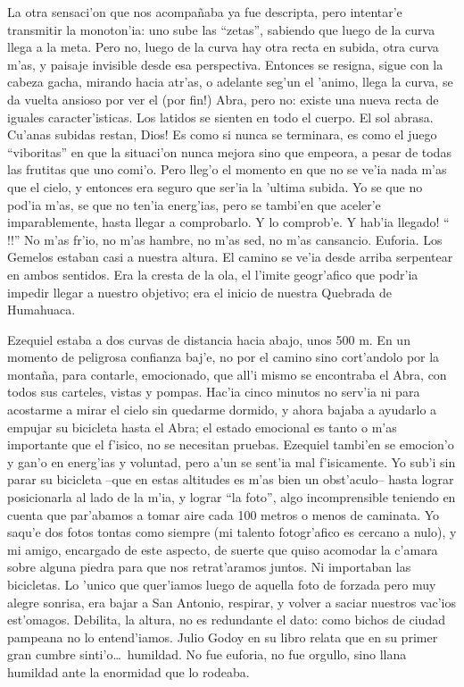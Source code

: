 La otra sensaci'on que nos acompa\~naba ya fue descripta, pero intentar'e
transmitir la monoton'ia: uno sube las ``zetas'', sabiendo que luego de la curva
llega a la meta. Pero no, luego de la curva hay otra recta en subida, otra curva
m'as, y paisaje invisible desde esa perspectiva. Entonces se resigna, sigue con
la cabeza gacha, mirando hacia atr'as, o adelante seg'un el 'animo, llega la
curva, se da vuelta ansioso por ver el (\textexclamdown por fin!) Abra, pero no:
existe una nueva recta de iguales caracter'isticas. Los latidos se sienten en
todo el cuerpo. El sol abrasa. \textexclamdown Cu'anas subidas restan, Dios! Es
como si nunca se terminara, es como el juego ``viboritas'' en que la situaci'on
nunca mejora sino que empeora, a pesar de todas las frutitas que uno comi'o.
Pero lleg'o el momento en que no se ve'ia nada m'as que el cielo, y entonces era
seguro que ser'ia la 'ultima subida. Yo se que no pod'ia m'as, se que no ten'ia
energ'ias, pero se tambi'en que aceler'e imparablemente, hasta llegar a
comprobarlo. Y lo comprob'e. \textexclamdown Y hab'ia llegado! ``\textexclamdown
{}!!'' No m'as fr'io,
no m'as hambre, no m'as sed, no m'as cansancio. Euforia. Los Gemelos estaban
casi a nuestra altura. El camino se ve'ia desde arriba serpentear en ambos
sentidos. Era la cresta de la ola, el l'imite geogr'afico que podr'ia impedir
llegar a nuestro objetivo; era el inicio de nuestra Quebrada de Humahuaca.

Ezequiel estaba a dos curvas de distancia hacia abajo, unos 500 m. En un momento
de peligrosa confianza baj'e, no por el camino sino cort'andolo por la
monta\~na, para contarle, emocionado, que all'i mismo se encontraba el Abra, con
todos sus carteles, vistas y pompas. Hac'ia cinco minutos no serv'ia ni para
acostarme a mirar el cielo sin quedarme dormido, y ahora bajaba a ayudarlo a
empujar su bicicleta hasta el Abra; el estado emocional es tanto o m'as
importante que el f'isico, no se necesitan pruebas. Ezequiel tambi'en se
emocion'o y gan'o en energ'ias y voluntad, pero a'un se sent'ia mal
f'isicamente. Yo sub'i sin parar su bicicleta --que en estas altitudes es m'as
bien un obst'aculo-- hasta lograr posicionarla al lado de la m'ia, y lograr
``la foto'', algo incomprensible teniendo en cuenta que par'abamos a tomar aire
cada 100 metros o menos de caminata. Yo saqu'e dos fotos tontas como siempre (mi
talento fotogr'afico es cercano a nulo), y mi amigo, encargado de este aspecto,
de suerte que quiso acomodar la c'amara sobre alguna piedra para que nos
retrat'aramos juntos. Ni importaban las bicicletas. Lo 'unico que quer'iamos
luego de aquella foto de forzada pero muy alegre sonrisa, era bajar a San
Antonio, respirar, y volver a saciar nuestros vac'ios est'omagos. Debilita, la
altura, no es redundante el dato: como bichos de ciudad pampeana no lo
entend'iamos. Julio Godoy en su libro relata que en su primer gran cumbre
sinti'o\ldots\ humildad. No fue euforia, no fue orgullo, sino llana humildad
ante la enormidad que lo rodeaba.

